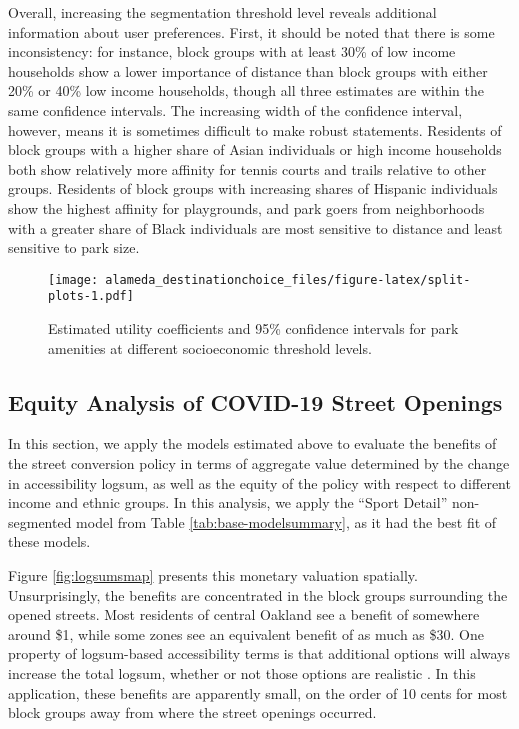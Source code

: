 \documentclass[3p, authoryear, review]{elsarticle} %
\begin{document}
Overall, increasing the segmentation threshold level reveals additional
information about user preferences. First, it should be noted that there is some
inconsistency: for instance, block groups with at least 30\% of low income
households show a lower importance of distance than block groups with either 20\%
or 40\% low income households, though all three estimates are within the same
confidence intervals. The increasing width of the confidence interval, however,
means it is sometimes difficult to make robust statements. Residents of
block groups with a higher share of Asian individuals or high income households both show
relatively more affinity for tennis courts and trails relative to other groups.
Residents of block groups with increasing shares of Hispanic individuals show
the highest affinity for playgrounds, and park goers from neighborhoods with a
greater share of Black individuals are most sensitive to distance and least
sensitive to park size.

\begin{figure}
\centering
\texttt{[image: alameda\_destinationchoice\_files/figure-latex/split-plots-1.pdf]}
\caption{\label{fig:split-plots}Estimated utility coefficients and 95\% confidence intervals for park amenities at different socioeconomic threshold levels.}
\end{figure}

\hypertarget{equity-analysis-of-covid-19-street-openings}{%
\subsection{Equity Analysis of COVID-19 Street Openings}\label{equity-analysis-of-covid-19-street-openings}}

In this section, we apply the models estimated above to evaluate the benefits of
the street conversion policy in terms of aggregate value determined by the
change in accessibility logsum, as well as the equity of the policy with respect
to different income and ethnic groups. In this analysis, we apply the ``Sport Detail''
non-segmented model from Table \ref{tab:base-modelsummary}, as it had the best
fit of these models.

Figure \ref{fig:logsumsmap} presents this monetary valuation spatially.
Unsurprisingly, the benefits are concentrated in the block groups surrounding
the opened streets. Most residents of central Oakland see a benefit of somewhere
around \$1, while some zones see an equivalent benefit of as much as \$30. One
property of logsum-based accessibility terms is that additional options
will always increase the total logsum, whether or not those options are realistic
\citep[p.~300]{benakiva}. In this application, these benefits are apparently small, on the order
of 10 cents for most block groups away from where the street openings occurred.
\end{document}
